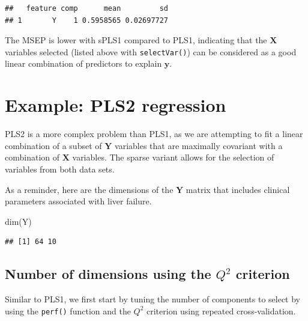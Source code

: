 \documentclass[
]{book}
\newenvironment{Shaded}{\begin{snugshade}}{\end{snugshade}}
\newcommand{\FunctionTok}[1]{\textcolor[rgb]{0.00,0.00,0.00}{#1}}
\newcommand{\NormalTok}[1]{#1}
\begin{document}
\begin{verbatim}
##   feature comp      mean         sd
## 1       Y    1 0.5958565 0.02697727
\end{verbatim}

The MSEP is lower with sPLS1 compared to PLS1, indicating that the \(\boldsymbol{X}\) variables selected (listed above with \texttt{selectVar()}) can be considered as a good linear combination of predictors to explain \(\boldsymbol y\).

\hypertarget{04:spls2}{%
\section{Example: PLS2 regression}\label{04:spls2}}

PLS2 is a more complex problem than PLS1, as we are attempting to fit a linear combination of a subset of \(\boldsymbol{Y}\) variables that are maximally covariant with a combination of \(\boldsymbol{X}\) variables. The sparse variant allows for the selection of variables from both data sets.

As a reminder, here are the dimensions of the \(\boldsymbol{Y}\) matrix that includes clinical parameters associated with liver failure.

\begin{Shaded}
\begin{Highlighting}[]
\FunctionTok{dim}\NormalTok{(Y)}
\end{Highlighting}
\end{Shaded}

\begin{verbatim}
## [1] 64 10
\end{verbatim}

\hypertarget{04:spls2-ncomp}{%
\subsection{\texorpdfstring{Number of dimensions using the \(Q^2\) criterion}{Number of dimensions using the Q\^{}2 criterion}}\label{04:spls2-ncomp}}

Similar to PLS1, we first start by tuning the number of components to select by using the \texttt{perf()} function and the \(Q^2\) criterion using repeated cross-validation.
\end{document}
